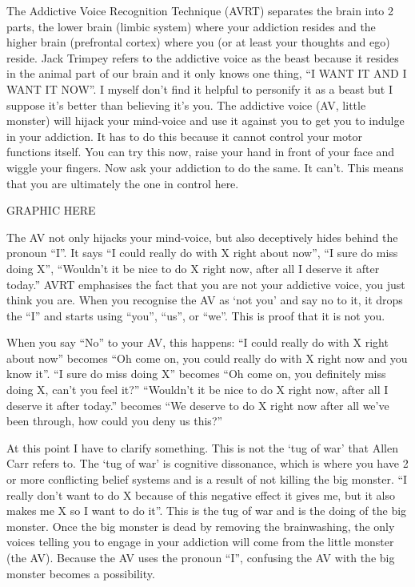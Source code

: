 \documentclass[
]{book}
\begin{document}
The Addictive Voice Recognition Technique (AVRT) separates the brain into 2 parts, the lower brain (limbic system) where your addiction resides and the higher brain (prefrontal cortex) where you (or at least your thoughts and ego) reside. Jack Trimpey refers to the addictive voice as the beast because it resides in the animal part of our brain and it only knows one thing, ``I WANT IT AND I WANT IT NOW''. I myself don't find it helpful to personify it as a beast but I suppose it's better than believing it's you. The addictive voice (AV, little monster) will hijack your mind-voice and use it against you to get you to indulge in your addiction. It has to do this because it cannot control your motor functions itself. You can try this now, raise your hand in front of your face and wiggle your fingers. Now ask your addiction to do the same. It can't. This means that you are ultimately the one in control here.

GRAPHIC HERE

The AV not only hijacks your mind-voice, but also deceptively hides behind the pronoun ``I''. It says ``I could really do with X right about now'', ``I sure do miss doing X'', ``Wouldn't it be nice to do X right now, after all I deserve it after today.'' AVRT emphasises the fact that you are not your addictive voice, you just think you are. When you recognise the AV as `not you' and say no to it, it drops the ``I'' and starts using ``you'', ``us'', or ``we''. This is proof that it is not you.

When you say ``No'' to your AV, this happens:
``I could really do with X right about now'' becomes ``Oh come on, you could really do with X right now and you know it''. ``I sure do miss doing X'' becomes ``Oh come on, you definitely miss doing X, can't you feel it?'' ``Wouldn't it be nice to do X right now, after all I deserve it after today.'' becomes ``We deserve to do X right now after all we've been through, how could you deny us this?''

At this point I have to clarify something. This is not the `tug of war' that Allen Carr refers to. The `tug of war' is cognitive dissonance, which is where you have 2 or more conflicting belief systems and is a result of not killing the big monster. ``I really don't want to do X because of this negative effect it gives me, but it also makes me X so I want to do it''. This is the tug of war and is the doing of the big monster. Once the big monster is dead by removing the brainwashing, the only voices telling you to engage in your addiction will come from the little monster (the AV). Because the AV uses the pronoun ``I'', confusing the AV with the big monster becomes a possibility.
\end{document}
